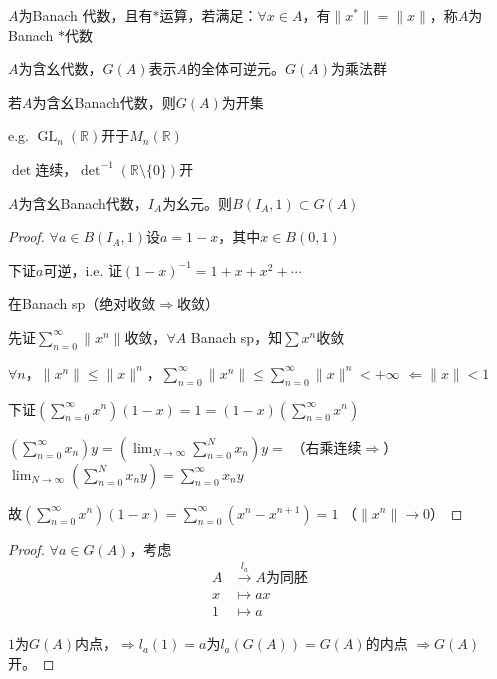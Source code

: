 \documentclass[lang=cn,a4paper,newtx,section]{elegantbook}
\begin{document}
\begin{definition}
  $A$为Banach 代数，且有$*$运算，若满足：$\forall x \in A$，有$\|x^*\| = \|x\|$，称$A$为Banach $*$代数
\end{definition}

\begin{definition}
  $A$为含幺代数，$G(A)$表示$A$的全体可逆元。$G(A)$为乘法群
\end{definition}

\begin{lemma}
  若$A$为含幺Banach代数，则$G(A)$为开集
  
  e.g. $\operatorname{GL}_n(\mathbb{R})$开于$M_n(\mathbb{R})$
  
  $\det$连续，$\det^{-1}(\mathbb{R} \setminus \{0\})$开
\end{lemma}

\begin{proposition}
  $A$为含幺Banach代数，$I_A$为幺元。则$B(I_A, 1) \subset G(A)$
\end{proposition}

\begin{proof}
  $\forall a \in B(I_A, 1)$设$a = 1 - x$，其中$x \in B(0, 1)$
  
  下证$a$可逆，i.e. 证$ (1-x)^{-1} = 1 + x + x^2 + \cdots$
  
  在Banach sp（绝对收敛$\Rightarrow$收敛）
  
  先证$\sum_{n=0}^{\infty} \|x^n\|$收敛，$\forall A$ Banach sp，知$\sum x^n$收敛
  
  $\forall n$，$\|x^n\| \leq \|x\|^n$，$\sum_{n=0}^{\infty} \|x^n\| \leq \sum_{n=0}^{\infty} \|x\|^n < +\infty$ $\Leftarrow \|x\| < 1$
  
  下证$(\sum_{n=0}^{\infty} x^n)(1-x) = 1 = (1-x)(\sum_{n=0}^{\infty} x^n)$
  
  $(\sum_{n=0}^{\infty} x_n) y = (\lim_{N\to\infty} \sum_{n=0}^{N} x_n) y = $ （右乘连续$\Rightarrow$）$\lim_{N\to\infty} (\sum_{n=0}^{N} x_n y) = \sum_{n=0}^{\infty} x_n y$
  
  故$(\sum_{n=0}^{\infty} x^n)(1-x) = \sum_{n=0}^{\infty} (x^n - x^{n+1}) = 1$ （$\|x^n\| \to 0$）
\end{proof}

\begin{proof}
  $\forall a \in G(A)$，考虑
  \begin{equation*}
    \begin{aligned}
      A &\xrightarrow{l_a} A \text{为同胚}\\
      x &\longmapsto ax \\
      1 &\longmapsto a
    \end{aligned}
  \end{equation*}
  
  $1$为$G(A)$内点，$\Rightarrow l_a(1) = a$为$l_a(G(A)) = G(A) $的内点
  $\Rightarrow G(A)$开。
\end{proof}
\end{document}
